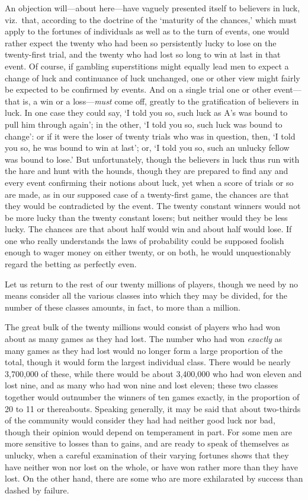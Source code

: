 \documentclass[letterpaper,12pt,oneside,openany]{memoir}
\begin{document}
An objection will---about here---have vaguely presented
itself to believers in luck, viz.\ that, according to
the doctrine of the `maturity of the chances,' which
must apply to the fortunes of individuals as well as to
the turn of events, one would rather expect the twenty
who had been so persistently lucky to lose on the
twenty-first trial, and the twenty who had lost so long
to win at last in that event. Of course, if gambling
superstitions might equally lead men to expect a change
of luck and continuance of luck unchanged, one or
other view might fairly be expected to be confirmed by
events. And on a single trial one or other event---that
is, a win or a loss---\textit{must} come off, greatly to the gratification
of believers in luck. In one case they could say,
`I told you so, such luck as A's was bound to pull him
through again'; in the other, `I told you so, such luck
was bound to change': or if it were the loser of twenty
trials who was in question, then, `I told you so, he was
bound to win at last'; or, `I told you so, such an unlucky
fellow was bound to lose.' But unfortunately,
though the believers in luck thus run with the hare and
hunt with the hounds, though they are prepared to find
any and every event confirming their notions about luck,
yet when a score of trials or so are made, as in our supposed
case of a twenty-first game, the chances are that
they would be contradicted by the event. The twenty
constant winners would not be more lucky than the
twenty constant losers; but neither would they be less
lucky. The chances are that about half would win and
about half would lose. If one who really understands
the laws of probability could be supposed foolish enough
to wager money on either twenty, or on both, he
would unquestionably regard the betting as perfectly
even.

Let us return to the rest of our twenty millions of
players, though we need by no means consider all the
various classes into which they may be divided, for the
number of these classes amounts, in fact, to more than
a million.

The great bulk of the twenty millions would consist
of players who had won about as many games as they
had lost. The number who had won \textit{exactly} as many
games as they had lost would no longer form a large
proportion of the total, though it would form the largest
individual class. There would be nearly 3,700,000 of
these, while there would be about 3,400,000 who had
won eleven and lost nine, and as many who had won
nine and lost eleven; these two classes together would
outnumber the winners of ten games exactly, in the
proportion of 20 to 11 or thereabouts. Speaking generally,
it may be said that about two-thirds of the community
would consider they had had neither good luck nor
bad, though their opinion would depend on temperament
in part. For some men are more sensitive to losses than
to gains, and are ready to speak of themselves as unlucky,
when a careful examination of their varying fortunes
shows that they have neither won nor lost on the whole,
or have won rather more than they have lost. On the
other hand, there are some who are more exhilarated by
success than dashed by failure.
\end{document}
